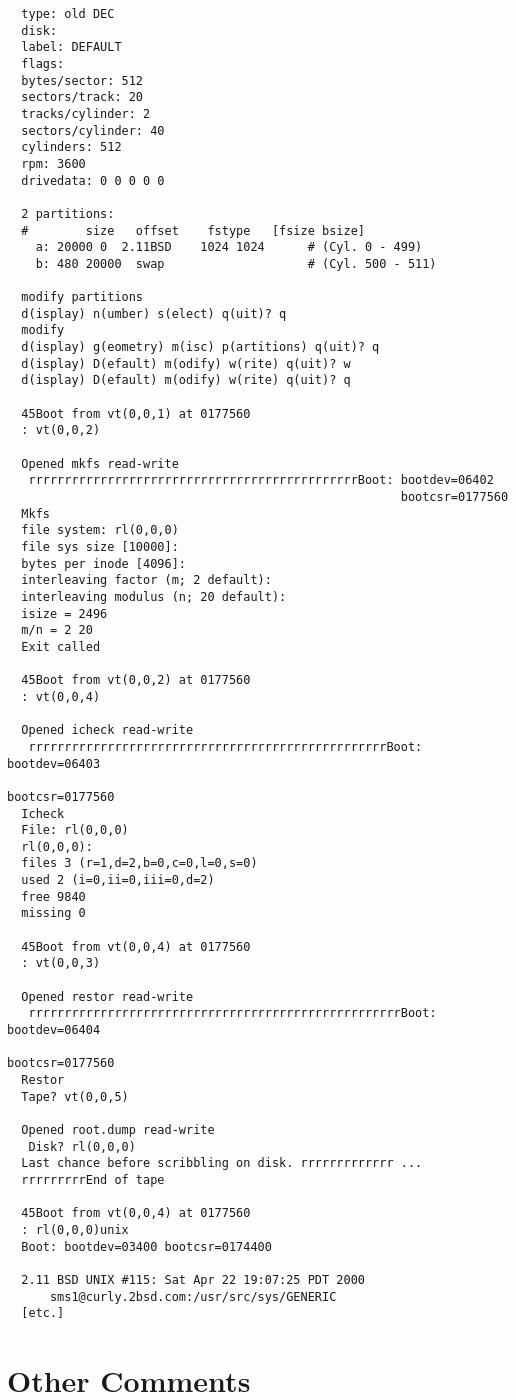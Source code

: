 \begin{verbatim}
  type: old DEC
  disk: 
  label: DEFAULT
  flags:
  bytes/sector: 512
  sectors/track: 20
  tracks/cylinder: 2
  sectors/cylinder: 40
  cylinders: 512
  rpm: 3600
  drivedata: 0 0 0 0 0
  
  2 partitions:
  #        size   offset    fstype   [fsize bsize]
    a: 20000 0  2.11BSD    1024 1024      # (Cyl. 0 - 499)
    b: 480 20000  swap                    # (Cyl. 500 - 511)
  
  modify partitions
  d(isplay) n(umber) s(elect) q(uit)? q
  modify
  d(isplay) g(eometry) m(isc) p(artitions) q(uit)? q
  d(isplay) D(efault) m(odify) w(rite) q(uit)? w
  d(isplay) D(efault) m(odify) w(rite) q(uit)? q
  
  45Boot from vt(0,0,1) at 0177560
  : vt(0,0,2)
  
  Opened mkfs read-write
   rrrrrrrrrrrrrrrrrrrrrrrrrrrrrrrrrrrrrrrrrrrrrrBoot: bootdev=06402
                                                       bootcsr=0177560
  Mkfs
  file system: rl(0,0,0)
  file sys size [10000]: 
  bytes per inode [4096]: 
  interleaving factor (m; 2 default): 
  interleaving modulus (n; 20 default): 
  isize = 2496
  m/n = 2 20
  Exit called
  
  45Boot from vt(0,0,2) at 0177560
  : vt(0,0,4)
  
  Opened icheck read-write
   rrrrrrrrrrrrrrrrrrrrrrrrrrrrrrrrrrrrrrrrrrrrrrrrrrBoot: bootdev=06403
                                                           bootcsr=0177560
  Icheck
  File: rl(0,0,0)
  rl(0,0,0):
  files 3 (r=1,d=2,b=0,c=0,l=0,s=0)
  used 2 (i=0,ii=0,iii=0,d=2)
  free 9840
  missing 0
  
  45Boot from vt(0,0,4) at 0177560
  : vt(0,0,3)
  
  Opened restor read-write
   rrrrrrrrrrrrrrrrrrrrrrrrrrrrrrrrrrrrrrrrrrrrrrrrrrrrBoot: bootdev=06404
                                                             bootcsr=0177560
  Restor
  Tape? vt(0,0,5)
  
  Opened root.dump read-write
   Disk? rl(0,0,0)
  Last chance before scribbling on disk. rrrrrrrrrrrrr ... 
  rrrrrrrrrEnd of tape
 
  45Boot from vt(0,0,4) at 0177560
  : rl(0,0,0)unix
  Boot: bootdev=03400 bootcsr=0174400
  
  2.11 BSD UNIX #115: Sat Apr 22 19:07:25 PDT 2000
      sms1@curly.2bsd.com:/usr/src/sys/GENERIC
  [etc.]
\end{verbatim}

\section{Other Comments}

